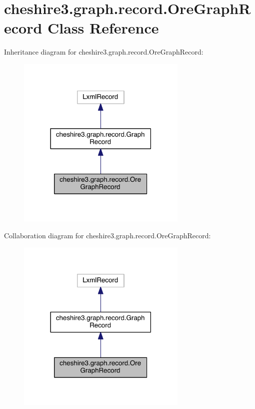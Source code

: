 \hypertarget{classcheshire3_1_1graph_1_1record_1_1_ore_graph_record}{\section{cheshire3.\-graph.\-record.\-Ore\-Graph\-Record Class Reference}
\label{classcheshire3_1_1graph_1_1record_1_1_ore_graph_record}
}


Inheritance diagram for cheshire3.\-graph.\-record.\-Ore\-Graph\-Record\-:
\nopagebreak
\begin{figure}[H]
\begin{center}
\leavevmode
\includegraphics[width=230pt]{classcheshire3_1_1graph_1_1record_1_1_ore_graph_record__inherit__graph}
\end{center}
\end{figure}


Collaboration diagram for cheshire3.\-graph.\-record.\-Ore\-Graph\-Record\-:
\nopagebreak
\begin{figure}[H]
\begin{center}
\leavevmode
\includegraphics[width=230pt]{classcheshire3_1_1graph_1_1record_1_1_ore_graph_record__coll__graph}
\end{center}
\end{figure}
